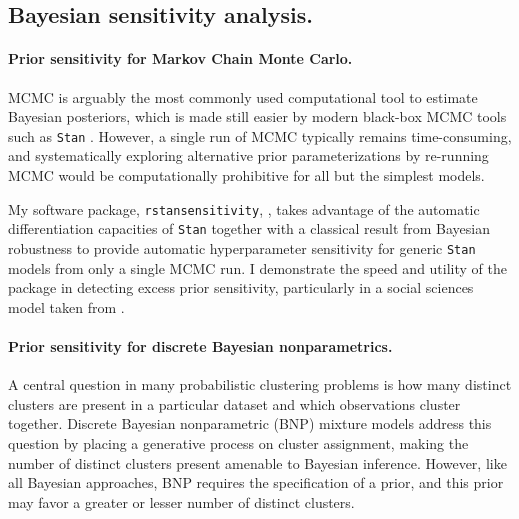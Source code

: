 \clearpage
\subsection*{Bayesian sensitivity analysis.}

\paragraph{Prior sensitivity for Markov Chain Monte Carlo.}

MCMC is arguably the most commonly used computational tool to estimate Bayesian
posteriors, which is made still easier by modern black-box MCMC tools such as
\texttt{Stan} \citep{carpenter:2017:stan, rstan}.  However, a single run of MCMC
typically remains time-consuming, and systematically exploring alternative prior
parameterizations by re-running MCMC would be computationally prohibitive for
all but the simplest models.

My software package, \texttt{rstansensitivity},
\citep{giordano:2020:rstansensitivity, giordano:2018:mcmchyper}, takes advantage
of the automatic differentiation capacities of \texttt{Stan}
\citep{carpenter:2015:stanmath} together with a classical result from  Bayesian
robustness \citep{gustafson:1996:localposterior, basu:1996:local,
giordano:2018:covariances} to provide automatic hyperparameter sensitivity for
generic \texttt{Stan} models from only a single MCMC run.  I demonstrate the
speed and utility of the package in detecting excess prior sensitivity,
particularly in a social sciences model taken from \citet[Chapter
13.5]{gelman:2006:arm}.


\paragraph{Prior sensitivity for discrete Bayesian nonparametrics.}

A central question in many probabilistic clustering problems is how many
distinct clusters are present in a particular dataset and which observations
cluster together. Discrete Bayesian nonparametric (BNP) mixture models address
this question by placing a generative process on cluster assignment, making the
number of distinct clusters present amenable to Bayesian inference.  However,
like all Bayesian approaches, BNP requires the specification of a prior, and
this prior may favor a greater or lesser number of distinct clusters.

